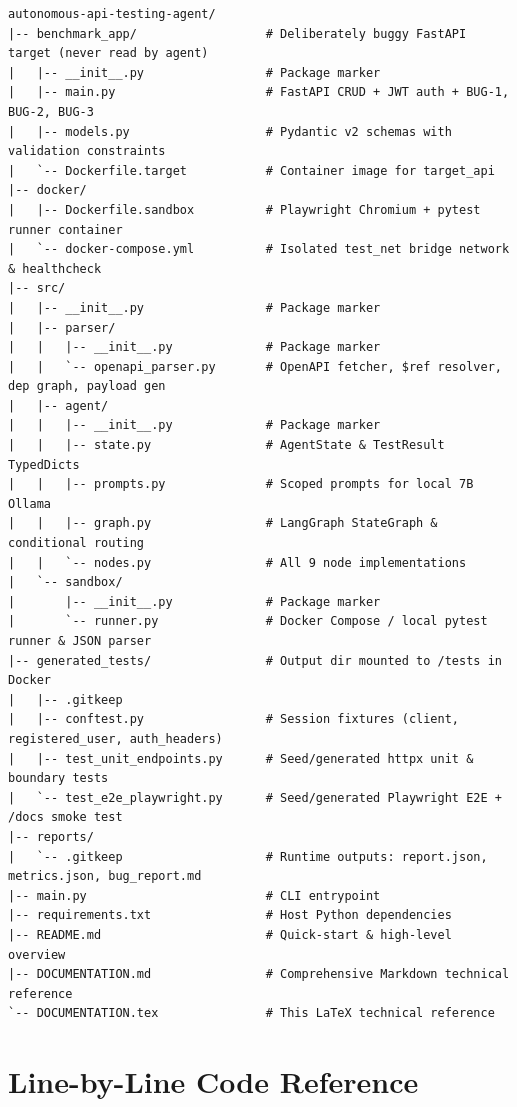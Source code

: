 \documentclass[11pt,a4paper]{article}
\begin{document}
\begin{lstlisting}
autonomous-api-testing-agent/
|-- benchmark_app/                  # Deliberately buggy FastAPI target (never read by agent)
|   |-- __init__.py                 # Package marker
|   |-- main.py                     # FastAPI CRUD + JWT auth + BUG-1, BUG-2, BUG-3
|   |-- models.py                   # Pydantic v2 schemas with validation constraints
|   `-- Dockerfile.target           # Container image for target_api
|-- docker/
|   |-- Dockerfile.sandbox          # Playwright Chromium + pytest runner container
|   `-- docker-compose.yml          # Isolated test_net bridge network & healthcheck
|-- src/
|   |-- __init__.py                 # Package marker
|   |-- parser/
|   |   |-- __init__.py             # Package marker
|   |   `-- openapi_parser.py       # OpenAPI fetcher, $ref resolver, dep graph, payload gen
|   |-- agent/
|   |   |-- __init__.py             # Package marker
|   |   |-- state.py                # AgentState & TestResult TypedDicts
|   |   |-- prompts.py              # Scoped prompts for local 7B Ollama
|   |   |-- graph.py                # LangGraph StateGraph & conditional routing
|   |   `-- nodes.py                # All 9 node implementations
|   `-- sandbox/
|       |-- __init__.py             # Package marker
|       `-- runner.py               # Docker Compose / local pytest runner & JSON parser
|-- generated_tests/                # Output dir mounted to /tests in Docker
|   |-- .gitkeep
|   |-- conftest.py                 # Session fixtures (client, registered_user, auth_headers)
|   |-- test_unit_endpoints.py      # Seed/generated httpx unit & boundary tests
|   `-- test_e2e_playwright.py      # Seed/generated Playwright E2E + /docs smoke test
|-- reports/
|   `-- .gitkeep                    # Runtime outputs: report.json, metrics.json, bug_report.md
|-- main.py                         # CLI entrypoint
|-- requirements.txt                # Host Python dependencies
|-- README.md                       # Quick-start & high-level overview
|-- DOCUMENTATION.md                # Comprehensive Markdown technical reference
`-- DOCUMENTATION.tex               # This LaTeX technical reference
\end{lstlisting}

\section{Line-by-Line Code Reference}
\end{document}
